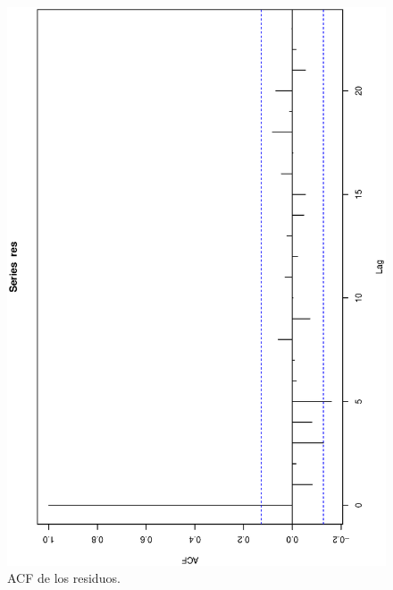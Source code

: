\begin{figure}[h]
    \begin{minipage}{0.45\textwidth}
        \includegraphics[width=0.8\linewidth,angle = 270]{Kap3/Fig_Cap3/agn_acf.eps}
        \caption{ACF de los residuos.}
        \label{fig:example_agn_acf}
    \end{minipage}
    \hfill
    \begin{minipage}{0.45\textwidth}

\end{minipage}
\end{figure}
